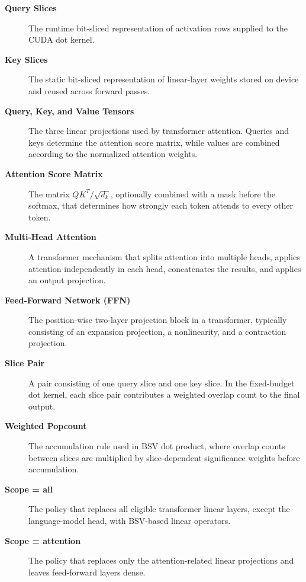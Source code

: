 \begin{description}
    \item[\textbf{Query Slices}]
    The runtime bit-sliced representation of activation rows supplied to the CUDA dot kernel.

    \item[\textbf{Key Slices}]
    The static bit-sliced representation of linear-layer weights stored on device and reused across forward passes.

    \item[\textbf{Query, Key, and Value Tensors}]
    The three linear projections used by transformer attention. Queries and keys determine the attention score matrix, while values are combined according to the normalized attention weights.

    \item[\textbf{Attention Score Matrix}]
    The matrix \(QK^{T}/\sqrt{d_k}\), optionally combined with a mask before the softmax, that determines how strongly each token attends to every other token.

    \item[\textbf{Multi-Head Attention}]
    A transformer mechanism that splits attention into multiple heads, applies attention independently in each head, concatenates the results, and applies an output projection.

    \item[\textbf{Feed-Forward Network (FFN)}]
    The position-wise two-layer projection block in a transformer, typically consisting of an expansion projection, a nonlinearity, and a contraction projection.

    \item[\textbf{Slice Pair}]
    A pair consisting of one query slice and one key slice. In the fixed-budget dot kernel, each slice pair contributes a weighted overlap count to the final output.

    \item[\textbf{Weighted Popcount}]
    The accumulation rule used in BSV dot product, where overlap counts between slices are multiplied by slice-dependent significance weights before accumulation.

    \item[\textbf{Scope = all}]
    The policy that replaces all eligible transformer linear layers, except the language-model head, with BSV-based linear operators.

    \item[\textbf{Scope = attention}]
    The policy that replaces only the attention-related linear projections and leaves feed-forward layers dense.


\end{description}
